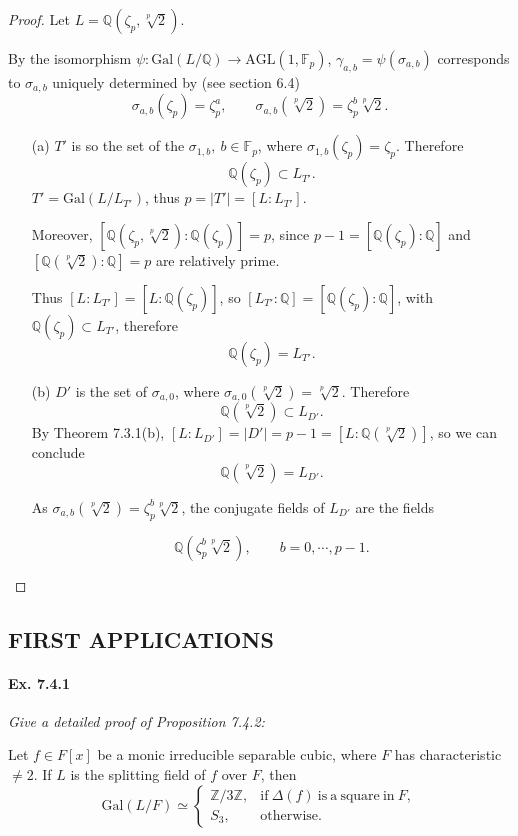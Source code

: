 \documentclass[11pt,a4paper]{article}
\newcommand{\Q}{\mathbb{Q}}
\newcommand{\Z}{\mathbb{Z}}
\newcommand{\F}{\mathbb{F}}
\newcommand{\Gal}{\mathrm{Gal}}
\begin{document}
\begin{proof}
Let $L = \Q(\zeta_p,\sqrt[p]{2})$.

By the isomorphism $\psi : \Gal(L/\Q) \to \mathrm{AGL}(1,\F_p)$, $\gamma_{a,b} = \psi(\sigma_{a,b})$ corresponds to $\sigma_{a,b}$ uniquely determined by (see section 6.4)
$$\sigma_{a,b}(\zeta_p) = \zeta_p^a,\qquad \sigma_{a,b}(\sqrt[p]{2}) = \zeta_p^b \sqrt[p]{2}.$$
\begin{enumerate}
\item[(a)]
$T'$ is so the set of the $\sigma_{1,b},\  b \in \F_p$, where $\sigma_{1,b}(\zeta_p) = \zeta_p$. Therefore $$ \Q(\zeta_p) \subset L_{T'}.$$
 $T' = \Gal(L/L_{T'})$, thus $p = \vert T' \vert = [L:L_{T'}]$.
 
Moreover, $[\Q(\zeta_p, \sqrt[p]{2}):\Q(\zeta_p)] = p$, since $p-1 = [\Q(\zeta_p) : \Q]$ and $[\Q(\sqrt[p]{2}):\Q] = p$ are relatively prime.

Thus $[L:L_{T'}] = [L:\Q(\zeta_p)]$, so $[L_{T'}:\Q] = [\Q(\zeta_p):\Q]$, with $ \Q(\zeta_p) \subset L_{T'}$, therefore
$$ \Q(\zeta_p) = L_{T'}.$$

\item[(b)]
$D'$ is the set of $\sigma_{a,0}$, where $\sigma_{a,0}(\sqrt[p]{2}) =  \sqrt[p]{2}$. Therefore
$$\Q(\sqrt[p]{2}) \subset L_{D'}.$$
By Theorem 7.3.1(b), $[L:L_{D'}] = \vert D' \vert = p-1 = [L : \Q(\sqrt[p]{2})]$, so we can conclude
$$\Q(\sqrt[p]{2}) = L_{D'}.$$

As $\sigma_{a,b} (\sqrt[p]{2}) = \zeta_p^b \sqrt[p]{2}$, the conjugate fields of $L_{D'}$ are the fields 

$$ \Q(\zeta_p^b\sqrt[p]{2}),\qquad b=0,\cdots,p-1.$$
\end{enumerate}
\end{proof}

\subsection{FIRST APPLICATIONS}

\paragraph{Ex. 7.4.1}

{\it Give a detailed proof of Proposition 7.4.2:

Let $f\in F[x]$ be a monic irreducible separable cubic, where $F$ has characteristic $\ne 2$. If $L$ is the splitting field of $f$ over $F$, then
$$
\Gal(L/F) \simeq 
\left\{
\begin{array}{ll}
 \Z/3\Z, &   \mathrm{if}\ \Delta(f)\ \mathrm{is}\  \mathrm{a}\  \mathrm{square}\  \mathrm{in} \ F,   \\
  S_3,&        \mathrm{otherwise.}
\end{array}
\right.
$$
}
\end{document}
